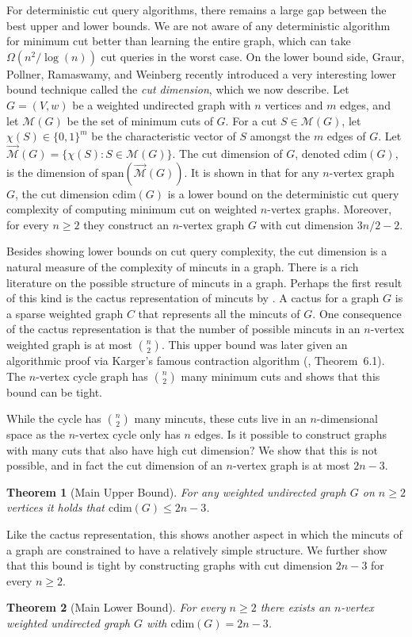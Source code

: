 \documentclass[10pt,a4paper]{article}
\newcommand{\M}{\mathcal{M}}
\newcommand{\laspan}{\mathrm{span}}
\newcommand{\cd}{\mathrm{cdim}}
\newcommand{\1}{\mathbf{1}}
\newtheorem{theorem}{Theorem}
\theoremstyle{definition}
\begin{document}
For deterministic cut query algorithms, there remains a large gap between the best upper and lower bounds.  We are not aware of any deterministic algorithm for minimum cut
better than learning the entire graph, which can take $\Omega(n^2/\log(n))$ cut queries in the worst case.  On the lower bound side, Graur, Pollner, Ramaswamy, and Weinberg \cite{GPRW20} recently introduced
a very interesting lower bound technique called the \emph{cut dimension}, which we now describe.  Let $G = (V,w)$ be a weighted undirected graph with $n$ vertices and $m$ edges, and let $\M(G)$ be
the set of minimum cuts of $G$.  For a cut $S \in \M(G)$,
let $\chi(S) \in \{0,1\}^{m}$ be the characteristic vector of $S$
amongst the $m$ edges of $G$.  Let $\vec{\M}(G) = \{\chi(S): S \in \M(G) \}$.  The cut dimension of $G$, denoted
$\cd(G)$, is the dimension of $\laspan(\vec{\M}(G))$.
It is shown in \cite{GPRW20} that for any $n$-vertex graph $G$, the cut dimension $\cd(G)$ is a lower bound on the deterministic cut query complexity of computing
minimum cut on weighted $n$-vertex graphs.  Moreover, for every $n \ge 2$ they construct an $n$-vertex graph $G$ with cut dimension $3n/2-2$.

Besides showing lower bounds on cut query complexity, the cut dimension is a natural measure of the complexity of mincuts in a graph.  There is a rich
literature on the possible structure of mincuts in a graph.  Perhaps the first result of this kind is the cactus representation of mincuts by \cite{DKL76}.
A cactus for a graph $G$ is a sparse weighted graph $C$ that represents all the mincuts of $G$.  One consequence of the
cactus representation is that the number of possible mincuts in an $n$-vertex weighted graph is at most $\binom{n}{2}$.  This upper bound was later given
an algorithmic proof via Karger's famous contraction algorithm (\cite{Karger93}, Theorem~6.1).  The
$n$-vertex cycle graph has $\binom{n}{2}$ many minimum cuts and shows that this bound can be tight.

While the cycle has $\binom{n}{2}$ many mincuts, these cuts live in an $n$-dimensional space as the $n$-vertex cycle only has $n$ edges.  Is it possible to construct graphs
with many cuts that also have high cut dimension?  We show that this is not possible, and in fact the cut dimension of an $n$-vertex graph is at most $2n-3$.

\begin{theorem}[Main Upper Bound]
\label{thm:cd_upper}
For any weighted undirected graph $G$ on $n\ge 2$ vertices it holds that $\cd(G) \le 2n-3$.
\end{theorem}
Like the cactus representation, this shows another aspect in which the mincuts of a graph are constrained to have a relatively simple structure.  We further show that this bound is
tight by constructing graphs with cut dimension $2n-3$ for every $n \ge 2$.
\begin{theorem}[Main Lower Bound]
\label{thm:cd_lower}
For every $n \ge 2$ there exists an $n$-vertex weighted undirected graph $G$ with $\cd(G) = 2n-3$.
\end{theorem}
\end{document}
